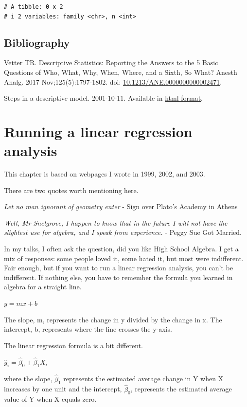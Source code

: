 \documentclass[
  letterpaper,
  DIV=11,
  numbers=noendperiod]{scrreprt}
\begin{document}
\begin{tcolorbox}
\begin{verbatim}
# A tibble: 0 x 2
# i 2 variables: family <chr>, n <int>
\end{verbatim}

\section{Bibliography}\label{bibliography-9}

Vetter TR. Descriptive Statistics: Reporting the Answers to the 5 Basic
Questions of Who, What, Why, When, Where, and a Sixth, So What? Anesth
Analg. 2017 Nov;125(5):1797-1802. doi:
\url{10.1213/ANE.0000000000002471}.

Steps in a descriptive model. 2001-10-11. Available in
\href{http://pmean.com/posts/steps-in-descriptive-model/}{html format}.


\chapter{Running a linear regression
analysis}\label{running-a-linear-regression-analysis}

This chapter is based on webpages I wrote in 1999, 2002, and 2003.

There are two quotes worth mentioning here.

\emph{Let no man ignorant of geometry enter} - Sign over Plato's Academy
in Athens

\emph{Well, Mr Snelgrove, I happen to know that in the future I will not
have the slightest use for algebra, and I speak from experience.} -
Peggy Sue Got Married.

In my talks, I often ask the question, did you like High School Algebra.
I get a mix of responses: some people loved it, some hated it, but most
were indifferent. Fair enough, but if you want to run a linear
regression analysis, you can't be indifferent. If nothing else, you have
to remember the formula you learned in algebra for a straight line.

\(y = mx + b\)

The slope, m, represents the change in y divided by the change in x. The
intercept, b, represents where the line crosses the y-axis.

The linear regression formula is a bit different.

\(\hat{y}_i=\hat\beta_0+\hat\beta_1 X_i\)

where the slope, \(\hat\beta_1\) represents the estimated average change
in Y when X increases by one unit and the intercept, \(\hat\beta_0\),
represents the estimated average value of Y when X equals zero.


\end{tcolorbox}
\end{document}
